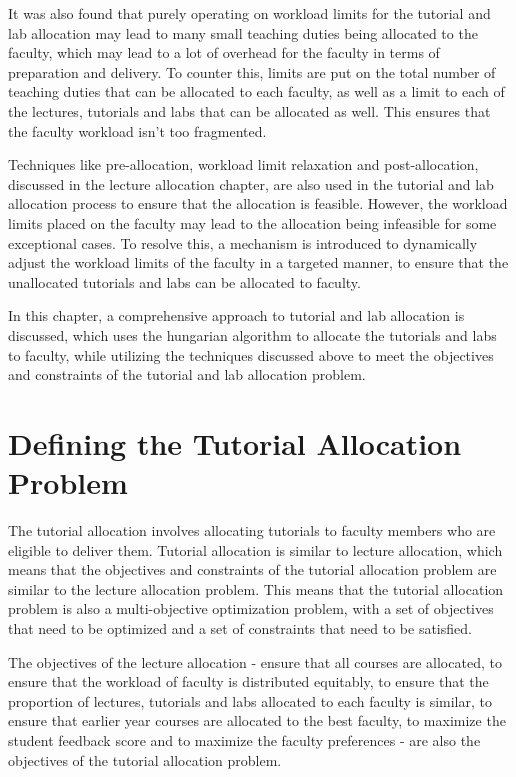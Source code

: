 It was also found that purely operating on workload limits for the tutorial and lab allocation may lead to many small teaching duties being allocated to the faculty, which may lead to a lot of overhead for the faculty in terms of preparation and delivery. To counter this, limits are put on the total number of teaching duties that can be allocated to each faculty, as well as a limit to each of the lectures, tutorials and labs that can be allocated as well. This ensures that the faculty workload isn't too fragmented.

Techniques like pre-allocation, workload limit relaxation and post-allocation, discussed in the lecture allocation chapter, are also used in the tutorial and lab allocation process to ensure that the allocation is feasible. However, the workload limits placed on the faculty may lead to the allocation being infeasible for some exceptional cases. To resolve this, a mechanism is introduced to dynamically adjust the workload limits of the faculty in a targeted manner, to ensure that the unallocated tutorials and labs can be allocated to faculty.

In this chapter, a comprehensive approach to tutorial and lab allocation is discussed, which uses the hungarian algorithm to allocate the tutorials and labs to faculty, while utilizing the techniques discussed above to meet the objectives and constraints of the tutorial and lab allocation problem.

\section{Defining the Tutorial Allocation Problem}

The tutorial allocation involves allocating tutorials to faculty members who are eligible to deliver them. Tutorial allocation is similar to lecture allocation, which means that the objectives and constraints of the tutorial allocation problem are similar to the lecture allocation problem. This means that the tutorial allocation problem is also a multi-objective optimization problem, with a set of objectives that need to be optimized and a set of constraints that need to be satisfied.

The objectives of the lecture allocation - ensure that all courses are allocated, to ensure that the workload of faculty is distributed equitably, to ensure that the proportion of lectures, tutorials and labs allocated to each faculty is similar, to ensure that earlier year courses are allocated to the best faculty, to maximize the student feedback score and to maximize the faculty preferences - are also the objectives of the tutorial allocation problem.

